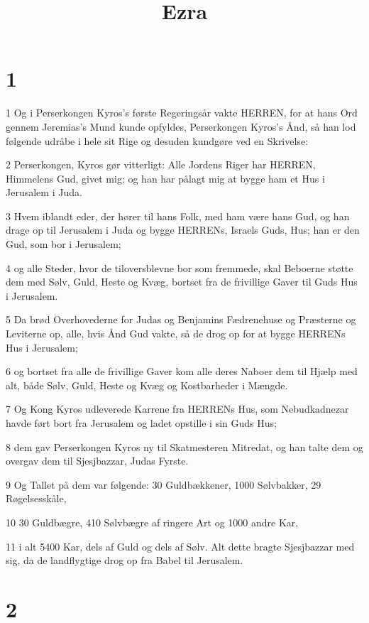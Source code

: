 

\title{Ezra}


\chapter{1}

\par 1 Og i Perserkongen Kyros's første Regeringsår vakte HERREN, for at hans Ord gennem Jeremias's Mund kunde opfyldes, Perserkongen Kyros's Ånd, så han lod følgende udråbe i hele sit Rige og desuden kundgøre ved en Skrivelse:
\par 2 Perserkongen, Kyros gør vitterligt: Alle Jordens Riger har HERREN, Himmelens Gud, givet mig; og han har pålagt mig at bygge ham et Hus i Jerusalem i Juda.
\par 3 Hvem iblandt eder, der hører til hans Folk, med ham være hans Gud, og han drage op til Jerusalem i Juda og bygge HERRENs, Israels Guds, Hus; han er den Gud, som bor i Jerusalem;
\par 4 og alle Steder, hvor de tiloversblevne bor som fremmede, skal Beboerne støtte dem med Sølv, Guld, Heste og Kvæg, bortset fra de frivillige Gaver til Guds Hus i Jerusalem.
\par 5 Da brød Overhovederne for Judas og Benjamins Fædrenehuse og Præsterne og Leviterne op, alle, hvis Ånd Gud vakte, så de drog op for at bygge HERRENs Hus i Jerusalem;
\par 6 og bortset fra alle de frivillige Gaver kom alle deres Naboer dem til Hjælp med alt, både Sølv, Guld, Heste og Kvæg og Kostbarheder i Mængde.
\par 7 Og Kong Kyros udleverede Karrene fra HERRENs Hus, som Nebudkadnezar havde ført bort fra Jerusalem og ladet opstille i sin Guds Hus;
\par 8 dem gav Perserkongen Kyros ny til Skatmesteren Mitredat, og han talte dem og overgav dem til Sjesjbazzar, Judas Fyrste.
\par 9 Og Tallet på dem var følgende: 30 Guldbækkener, 1000 Sølvbakker, 29 Røgelsesskåle,
\par 10 30 Guldbægre, 410 Sølvbægre af ringere Art og 1000 andre Kar,
\par 11 i alt 5400 Kar, dels af Guld og dels af Sølv. Alt dette bragte Sjesjbazzar med sig, da de landflygtige drog op fra Babel til Jerusalem.

\chapter{2}


